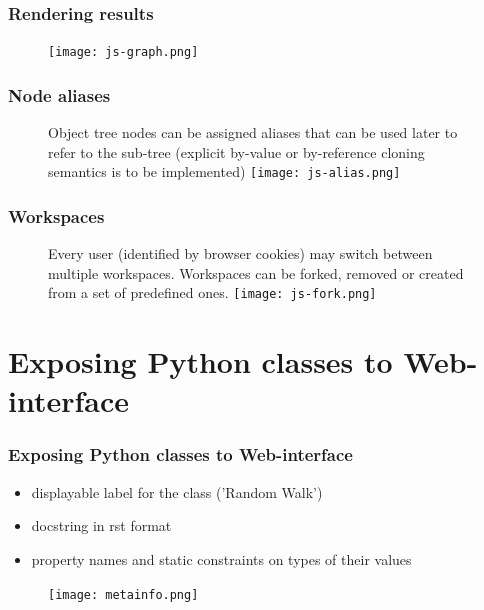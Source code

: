 \documentclass{beamer}
\begin{document}
\begin{frame}
\frametitle{Rendering results}
\begin{figure}[htbp]
\centering
\texttt{[image: js-graph.png]}
\end{figure}
\end{frame}

\begin{frame}
\frametitle{Node aliases}
\begin{figure}[htbp]
Object tree nodes can be assigned aliases that can be used later to refer to the sub-tree (explicit by-value or by-reference cloning semantics is to be implemented)
\centering
\texttt{[image: js-alias.png]}
\end{figure}
\end{frame}

\begin{frame}
\frametitle{Workspaces}
\begin{figure}[htbp]
Every user (identified by browser cookies) may switch between multiple workspaces. Workspaces can be forked, removed or created from a set of predefined ones.
\centering
\texttt{[image: js-fork.png]}
\end{figure}
\end{frame}

\section{Exposing Python classes to Web-interface}
\begin{frame}
\frametitle{Exposing Python classes to Web-interface}
\begin{itemize}
  \item displayable label for the class ('Random Walk')
  \item docstring in rst format
  \item property names and static constraints on types of their values
\end{itemize}
\begin{figure}[htbp]
\centering
\texttt{[image: metainfo.png]}
\end{figure}
\end{frame}
\end{document}
